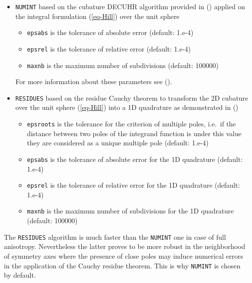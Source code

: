 \documentclass[
  a4paper,
  numbers=noendperiod,
  DIV=12]{scrreprt}
\providecommand{\tightlist}{%
  \setlength{\itemsep}{0pt}\setlength{\parskip}{0pt}}
\begin{document}
\begin{itemize}
\item
  \texttt{NUMINT} based on the cubature DECUHR algorithm provided in
  () applied on the
  integral formulation (\ref{eq-Hill}) over the unit sphere

  \begin{itemize}
  \tightlist
  \item
    \texttt{epsabs} is the tolerance of absolute error (default: 1.e-4)
  \item
    \texttt{epsrel} is the tolerance of relative error (default: 1.e-4)
  \item
    \texttt{maxnb} is the maximum number of subdivisions (default:
    100000)
  \end{itemize}

  For more information about these parameters see
  ().
\item
  \texttt{RESIDUES} based on the residue Cauchy theorem to transform the
  2D cubature over the unit sphere (\ref{eq-Hill}) into a 1D quadrature
  as demonstrated in ()

  \begin{itemize}
  \tightlist
  \item
    \texttt{epsroots} is the tolerance for the criterion of multiple
    poles, i.e.~if the distance between two poles of the integrand
    function is under this value they are considered as a unique
    multiple pole (default: 1.e-4)
  \item
    \texttt{epsabs} is the tolerance of absolute error for the 1D
    quadrature (default: 1.e-4)
  \item
    \texttt{epsrel} is the tolerance of relative error for the 1D
    quadrature (default: 1.e-4)
  \item
    \texttt{maxnb} is the maximum number of subdivisions for the 1D
    quadrature (default: 100000)
  \end{itemize}
\end{itemize}

\begin{tcolorbox}[enhanced jigsaw, arc=.35mm, bottomrule=.15mm, bottomtitle=1mm, breakable, colback=white, colbacktitle=quarto-callout-warning-color!10!white, colframe=quarto-callout-warning-color-frame, coltitle=black, left=2mm, leftrule=.75mm, opacityback=0, opacitybacktitle=0.6, rightrule=.15mm, title=\textcolor{quarto-callout-warning-color}{\faExclamationTriangle}\hspace{0.5em}{Warning}, titlerule=0mm, toprule=.15mm, toptitle=1mm]

The \texttt{RESIDUES} algorithm is much faster than the \texttt{NUMINT}
one in case of full anisotropy. Nevertheless the latter proves to be
more robust in the neighborhood of symmetry axes where the presence of
close poles may induce numerical errors in the application of the Cauchy
residue theorem. This is why \texttt{NUMINT} is chosen by default.

\end{tcolorbox}
\end{document}
